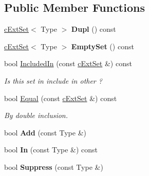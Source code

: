 \subsection*{Public Member Functions}
\begin{DoxyCompactItemize}
\item 
\hyperlink{classMMVII_1_1cExtSet}{c\+Ext\+Set}$<$ Type $>$ {\bfseries Dupl} () const \hypertarget{classMMVII_1_1cExtSet_afa221f7c71e12a3c67ad11a107766712}{}\label{classMMVII_1_1cExtSet_afa221f7c71e12a3c67ad11a107766712}

\item 
\hyperlink{classMMVII_1_1cExtSet}{c\+Ext\+Set}$<$ Type $>$ {\bfseries Empty\+Set} () const \hypertarget{classMMVII_1_1cExtSet_a75a92eaab98b0c0c53070b1fc7849079}{}\label{classMMVII_1_1cExtSet_a75a92eaab98b0c0c53070b1fc7849079}

\item 
bool \hyperlink{classMMVII_1_1cExtSet_a55f468934f579d348371f62eccee4ed6}{Included\+In} (const \hyperlink{classMMVII_1_1cExtSet}{c\+Ext\+Set} \&) const \hypertarget{classMMVII_1_1cExtSet_a55f468934f579d348371f62eccee4ed6}{}\label{classMMVII_1_1cExtSet_a55f468934f579d348371f62eccee4ed6}

\begin{DoxyCompactList}\small\item\em Is this set in include in other ? \end{DoxyCompactList}\item 
bool \hyperlink{classMMVII_1_1cExtSet_a7d958bf88386c0d84c6aa0e27c1db5ea}{Equal} (const \hyperlink{classMMVII_1_1cExtSet}{c\+Ext\+Set} \&) const \hypertarget{classMMVII_1_1cExtSet_a7d958bf88386c0d84c6aa0e27c1db5ea}{}\label{classMMVII_1_1cExtSet_a7d958bf88386c0d84c6aa0e27c1db5ea}

\begin{DoxyCompactList}\small\item\em By double inclusion. \end{DoxyCompactList}\item 
bool {\bfseries Add} (const Type \&)\hypertarget{classMMVII_1_1cExtSet_a5c85b752a3eb8a782c7b246a96cf0169}{}\label{classMMVII_1_1cExtSet_a5c85b752a3eb8a782c7b246a96cf0169}

\item 
bool {\bfseries In} (const Type \&) const \hypertarget{classMMVII_1_1cExtSet_a9f05e64746700810c62241598cc460d0}{}\label{classMMVII_1_1cExtSet_a9f05e64746700810c62241598cc460d0}

\item 
bool {\bfseries Suppress} (const Type \&)\hypertarget{classMMVII_1_1cExtSet_aec9d3f6fd1e9ffa67ac33917963028a7}{}\label{classMMVII_1_1cExtSet_aec9d3f6fd1e9ffa67ac33917963028a7}


\end{DoxyCompactItemize}
